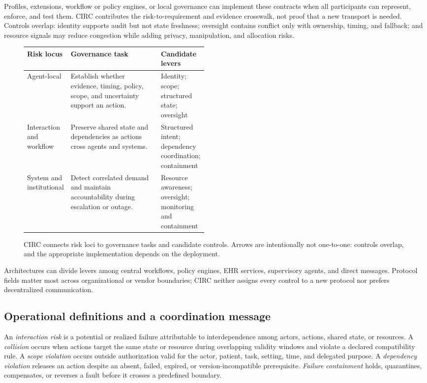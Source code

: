 \documentclass[10pt]{article}
\begin{document}
Profiles, extensions, workflow or policy engines, or local governance can implement these contracts
when all participants can represent, enforce, and test them. CIRC contributes the risk-to-requirement
and evidence crosswalk, not proof that a new transport is needed. Controls overlap: identity supports
audit but not state freshness; oversight contains conflict only with ownership, timing, and fallback;
and resource signals may reduce congestion while adding privacy, manipulation, and allocation risks.

\begin{figure}[htbp]
\centering
\small
\setlength{\tabcolsep}{5pt}
\begin{tabularx}{0.97\linewidth}{C{0.22\linewidth}YB{0.25\linewidth}}
\toprule
Risk locus & Governance task & Candidate levers \\
\midrule
Agent-local & Establish whether evidence, timing, policy, scope, and uncertainty support an action. &
Identity; scope; structured state; oversight \\
Interaction and workflow & Preserve shared state and dependencies as actions cross agents and
systems. & Structured intent; dependency coordination; containment \\
System and institutional & Detect correlated demand and maintain accountability during escalation
or outage. & Resource awareness; oversight; monitoring and containment \\
\bottomrule
\end{tabularx}
\caption{CIRC connects risk loci to governance tasks and candidate controls. Arrows are intentionally
not one-to-one: controls overlap, and the appropriate implementation depends on the deployment.}
\label{fig:risk-control-map}
\end{figure}

Architectures can divide levers among central workflows, policy engines, EHR services, supervisory
agents, and direct messages. Protocol fields matter most across organizational or vendor boundaries;
CIRC neither assigns every control to a new protocol nor prefers decentralized communication.

\subsection{Operational definitions and a coordination message}

An \emph{interaction risk} is a potential or realized failure attributable to interdependence among
actors, actions, shared state, or resources. A \emph{collision} occurs when actions target the same
state or resource during overlapping validity windows and violate a declared compatibility rule. A
\emph{scope violation} occurs outside authorization valid for the actor, patient, task, setting, time,
and delegated purpose. A \emph{dependency violation} releases an action despite an absent, failed,
expired, or version-incompatible prerequisite. \emph{Failure containment} holds, quarantines,
compensates, or reverses a fault before it crosses a predefined boundary.
\end{document}
